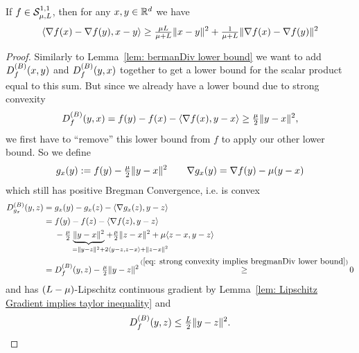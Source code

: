 \begin{lemma}
	\label{lem: bermanDiv lower bound (strongly convex)}
	If \(f\in\mathcal{S}^{1,1}_{{\mu},{L}}\), then for any
	\(x,y\in\mathbb{R}^d\) we have
	\begin{align*}
		\langle \nabla f(x) - \nabla f(y), x-y\rangle 
		\ge \tfrac{\mu L}{\mu+L} \| x-y\|^2
		+ \tfrac{1}{\mu+L}\|\nabla f(x) -\nabla f(y)\|^2
	\end{align*}
\end{lemma}
\begin{proof}
	Similarly to Lemma~\ref{lem: bermanDiv lower bound} we want to
	add \(D^{(B)}_{f}(x,y)\) and \(D^{(B)}_{f}(y,x)\) together to
	get a lower bound for the scalar product equal to this sum. But since we
	already have a lower bound due to strong convexity
	\begin{align}\label{eq: strong convexity implies bregmanDiv lower bound}
		D^{(B)}_{f}(y,x) = f(y) - f(x) -\langle\nabla f(x), y-x\rangle
		\ge \tfrac{\mu}2 \|y-x\|^2,
	\end{align}
	we first have to ``remove'' this lower bound from \(f\) to apply our other
	lower bound. So we define
	\begin{align*}
		g_x(y) := f(y) - \tfrac{\mu}2\|y-x\|^2 \qquad
		\nabla g_x(y) = \nabla f(y) - \mu(y-x)
	\end{align*}
	which still has positive Bregman Convergence, i.e. is convex
	\begin{align*}
		\bregmanDiv{g_x}(y,z)
		&= g_x(y) - g_x(z) - \langle\nabla g_x(z), y-z\rangle \\
		&= 
		\begin{aligned}[t]
			& f(y) - f(z) -\langle\nabla f(z), y-z\rangle \\
			&- \tfrac\lbound{2}\underbrace{\|y-x\|^2}_{
				=\|y-z\|^2 + \mathrlap{2\langle y-z, z-x\rangle + \|z-x\|^2}
			}
			+ \tfrac\lbound{2}\|z-x\|^2
			+ \lbound\langle z-x, y-z\rangle
		\end{aligned}\\
		&= \bregmanDiv{f}(y,z) - \tfrac{\lbound}2\|y-z\|^2
		\xge{(\ref{eq: strong convexity implies bregmanDiv lower bound})} 0
	\end{align*}
	and has \((L-\mu)\)-Lipschitz continuous gradient by
	Lemma~\ref{lem: Lipschitz Gradient implies taylor inequality} and 
	\begin{align}
		\label{eq: bregmanDiv upper bound}
		D^{(B)}_{f}(y,z) \le \tfrac{L}2\|y-z\|^2.
	\end{align}

\end{proof}
